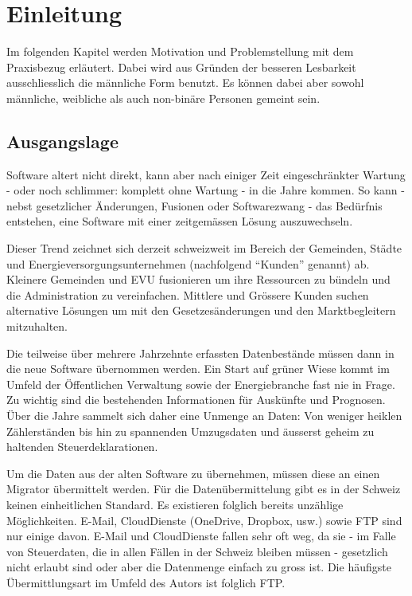 \chapter{Einleitung}
Im folgenden Kapitel werden Motivation und Problemstellung mit dem Praxisbezug erläutert. 
Dabei wird aus Gründen der besseren Lesbarkeit ausschliesslich 
die männliche Form benutzt. Es können dabei aber sowohl männliche, 
weibliche als auch non-binäre Personen gemeint sein.

\section{Ausgangslage}
Software altert nicht direkt, kann aber nach einiger Zeit eingeschränkter Wartung - oder noch schlimmer: komplett ohne Wartung - in die Jahre kommen. 
So kann - nebst gesetzlicher Änderungen, Fusionen oder Softwarezwang - das Bedürfnis entstehen, eine Software mit einer zeitgemässen Lösung auszuwechseln.   

Dieser Trend zeichnet sich derzeit schweizweit im Bereich der Gemeinden, Städte und Energieversorgungsunternehmen 
(nachfolgend ``Kunden'' genannt) ab. 
Kleinere Gemeinden und EVU fusionieren um ihre Ressourcen zu bündeln und die Administration zu vereinfachen. 
Mittlere und Grössere Kunden suchen alternative Lösungen um mit den Gesetzesänderungen und den Marktbegleitern mitzuhalten.  

Die teilweise über mehrere Jahrzehnte erfassten Datenbestände müssen dann in die neue Software übernommen werden. 
Ein Start auf grüner Wiese kommt im Umfeld der Öffentlichen Verwaltung sowie der Energiebranche fast nie in Frage. 
Zu wichtig sind die bestehenden Informationen für Auskünfte und Prognosen. 
Über die Jahre sammelt sich daher eine Unmenge an Daten: 
Von weniger heiklen Zählerständen bis hin zu spannenden Umzugsdaten und äusserst geheim zu haltenden Steuerdeklarationen. 

Um die Daten aus der alten Software zu übernehmen, müssen diese an einen Migrator übermittelt werden. 
Für die Datenübermittelung gibt es in der Schweiz keinen einheitlichen Standard. 
Es existieren folglich bereits unzählige Möglichkeiten.
E-Mail, CloudDienste (OneDrive, Dropbox, usw.) sowie FTP sind nur einige davon. E-Mail und CloudDienste fallen sehr oft weg, da sie - im Falle von Steuerdaten, die in allen Fällen in der Schweiz bleiben müssen - gesetzlich nicht erlaubt sind oder aber die Datenmenge einfach zu gross ist. 
Die häufigste Übermittlungsart im Umfeld des Autors ist folglich FTP. 

